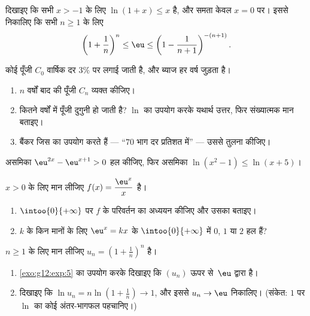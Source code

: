\begin{exercise}[$\star\star$]\label{exo:g12:exp:5}
दिखाइए कि सभी $x > -1$ के लिए $\ln(1 + x) \leq x$ है, और समता केवल $x = 0$ पर। इससे निकालिए कि
सभी $n \geq 1$ के लिए
\[
\left(1 + \frac{1}{n}\right)^n \leq \eu \leq \left(1 - \frac{1}{n+1}\right)^{-(n+1)} .
\]
\end{exercise}

\begin{exercise}[$\star\star$]\label{exo:g12:exp:6}
कोई पूँजी $C_0$ वार्षिक दर $3\%$ पर लगाई जाती है, और ब्याज हर वर्ष जुड़ता है।
\begin{enumerate}
  \item $n$ वर्षों बाद की पूँजी $C_n$ व्यक्त कीजिए।
  \item कितने वर्षों में पूँजी दुगुनी हो जाती है? $\ln$ का उपयोग करके यथार्थ
        उत्तर, फिर संख्यात्मक मान बताइए।
  \item बैंकर जिस  का उपयोग करते हैं --- ``$70$ भाग दर प्रतिशत में''
        --- उससे तुलना कीजिए।
\end{enumerate}
\end{exercise}

\begin{exercise}[$\star\star$]\label{exo:g12:exp:7}
असमिका $\eu^{2x} - \eu^{x+1} > 0$ हल कीजिए, फिर असमिका $\ln(x^2 - 1) \leq \ln(x + 5)$।
\end{exercise}

\begin{exercise}[$\star\star\star$]\label{exo:g12:exp:8}
$x > 0$ के लिए मान लीजिए $f(x) = \dfrac{\eu^x}{x}$ है।
\begin{enumerate}
  \item $\intoo{0}{+\infty}$ पर $f$ के परिवर्तन का अध्ययन कीजिए और उसका  बताइए।
  \item $k$ के किन मानों के लिए  $\eu^x = kx$ के $\intoo{0}{+\infty}$ में $0$, $1$ या
        $2$ हल हैं?
\end{enumerate}
\end{exercise}

\begin{exercise}[$\star\star\star$]\label{exo:g12:exp:9}
$n \geq 1$ के लिए मान लीजिए $u_n = \left(1 + \frac1n\right)^n$ है।
\begin{enumerate}
  \item \cref{exo:g12:exp:5} का उपयोग करके दिखाइए कि $(u_n)$ ऊपर से~$\eu$ द्वारा  है।
  \item दिखाइए कि $\ln u_n = n \ln\left(1 + \frac1n\right) \to 1$, और इससे $u_n \to \eu$ निकालिए। (संकेत: $1$ पर $\ln$ का
        कोई अंतर-भागफल पहचानिए।)
\end{enumerate}
\end{exercise}

